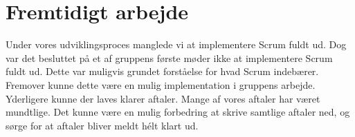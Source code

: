 \section{Fremtidigt arbejde}

Under vores udviklingsproces manglede vi at implementere Scrum fuldt ud. Dog var det besluttet på et af gruppens første møder ikke at implementere Scrum fuldt ud. Dette var muligvis grundet forståelse for hvad Scrum indebærer. Fremover kunne dette være en mulig implementation i gruppens arbejde.
Yderligere kunne der laves klarer aftaler. Mange af vores aftaler har været mundtlige. Det kunne være en mulig forbedring at skrive samtlige aftaler ned, og sørge for at aftaler bliver meldt hélt klart ud.